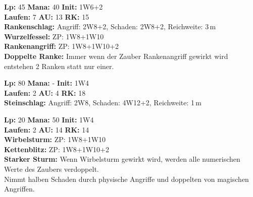 \documentclass[../../Heldenanleitung2]{subfiles}
\begin{document}
\begin{multicols}{2}
\begin{tcolorbox}[title={Humuselementar},colbacktitle=green, coltitle=black]    
   \textbf{Lp:} 45
   \textbf{Mana:} 40
   \textbf{Init:} 1W6+2\\
   \textbf{Laufen:} 7
   \textbf{AU:} 13
   \textbf{RK:} 15\\
   
   \textbf{Rankenschlag:} Angriff: 2W8+2, Schaden: 2W8+2, Reichweite: 3\,m\\
   
   \textbf{Wurzelfessel:} ZP: 1W8+1W10\\
   
   \textbf{Rankenangriff:} ZP: 1W8+1W10+2\\
   
   \textbf{Doppelte Ranke:} Immer wenn der Zauber Rankenangriff gewirkt wird entstehen 2 Ranken statt nur einer.
\end{tcolorbox}

\begin{tcolorbox}[title={Erzelementar},colbacktitle=brown, coltitle=white]    
   \textbf{Lp:} 80
   \textbf{Mana:} -
   \textbf{Init:} 1W4\\
   \textbf{Laufen:} 2
   \textbf{AU:} 4
   \textbf{RK:} 18\\
   
   \textbf{Steinschlag:} Angriff: 2W8, Schaden: 4W12+2, Reichweite: 1\,m\\
\end{tcolorbox}

\begin{tcolorbox}[title={Luftelementar},colbacktitle=white, coltitle=black]    
   \textbf{Lp:} 20
   \textbf{Mana:} 50
   \textbf{Init:} 1W4\\
   \textbf{Laufen:} 2
   \textbf{AU:} 14
   \textbf{RK:} 14\\
   
   \textbf{Wirbelsturm:} ZP: 1W8+1W10\\
   
   \textbf{Kettenblitz:} ZP: 1W8+1W10+2\\
   
   \textbf{Starker Sturm:} Wenn Wirbelsturm gewirkt wird, werden alle numerischen Werte des Zaubers verdoppelt.\\
   
   Nimmt halben Schaden durch physische Angriffe und doppelten von magischen Angriffen.
\end{tcolorbox}

\end{multicols}
\end{document}
